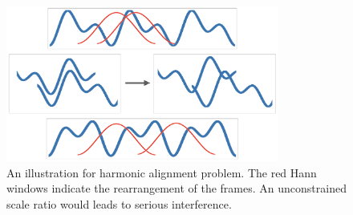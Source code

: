 \documentclass[12pt]{article}
\begin{document}
\begin{figure}
\begin{center}
  \includegraphics[width=0.8\textwidth]{assets/figures/2}
\end{center}
\caption{An illustration for harmonic alignment problem. The red Hann windows indicate the rearrangement of the frames. An unconstrained scale ratio would leads to serious interference.}
\label{fig:2}
\end{figure}



\end{document}
